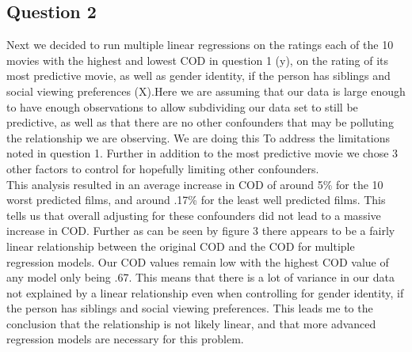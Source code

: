 \documentclass{article}
\begin{document}
\subsection*{Question 2}
Next we decided to run multiple linear regressions on the ratings each of the 10 movies with the highest and lowest COD in question 1 (y), on the rating of its most predictive movie, as well as gender identity, if the person has siblings and social viewing preferences (X).Here we are assuming that our data is large enough to have enough observations to allow subdividing our data set to still be predictive, as well as that there are no other confounders that may be polluting the relationship we are observing. We are doing this To address the limitations noted in question 1. Further in addition to the most predictive movie we chose 3 other factors to control for hopefully limiting other confounders. \\
This analysis resulted in an average increase in COD of around 5\% for the 10 worst predicted films, and around .17\% for the least well predicted films. This tells us that overall adjusting for these confounders did not lead to a massive increase in COD. Further as can be seen by figure 3 there appears to be a fairly linear relationship between the original COD and the COD for multiple regression models. Our COD values remain low with the highest COD value of any model only being .67. This means that there is a lot of variance in our data not explained by a linear relationship even when controlling for gender identity, if the person has siblings and social viewing preferences. This leads me to the conclusion that the relationship is not likely linear, and that more advanced regression models are necessary for this problem.
\end{document}
